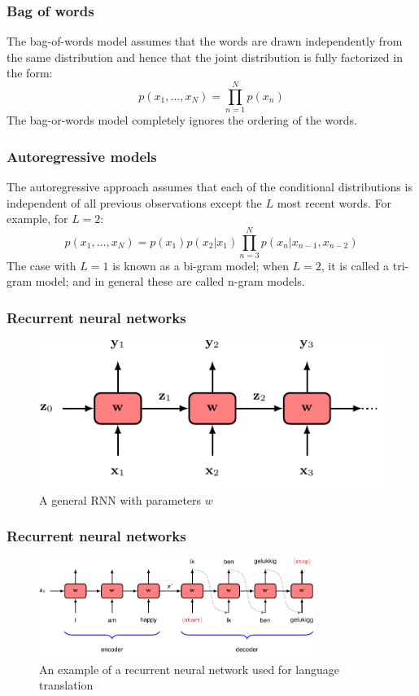 \documentclass{beamer}
\begin{document}
\begin{frame}
    \frametitle{Bag of words}
    The bag-of-words model assumes that the words are drawn independently from the same distribution and hence that the joint distribution is fully factorized in the form:
    \begin{equation*}
        p(x_{1},\hdots,x_{N})=\prod_{n=1}^{N}p(x_{n})
    \end{equation*}
    The bag-or-words model completely ignores the ordering of the words.
\end{frame}

\begin{frame}
    \frametitle{Autoregressive models}
    The autoregressive approach assumes that each of the conditional distributions is independent of all previous observations except the $L$ most recent words. For example, for $L=2$:
    \begin{equation*}
        p(x_{1},\hdots,x_{N})=p(x_{1})p(x_{2}|x_{1})\prod_{n=3}^{N}p(x_{n}|x_{n-1},x_{n-2})
    \end{equation*}
    The case with $L=1$ is known as a bi-gram model; when $L=2$, it is called a tri-gram model; and in general these are called n-gram models.
\end{frame}

\begin{frame}
    \frametitle{Recurrent neural networks}
    \begin{figure}
        \caption{A general RNN with parameters $w$}
        \includegraphics{Figure_13.pdf}
    \end{figure}
\end{frame}

\begin{frame}
    \frametitle{Recurrent neural networks}
    \begin{figure}
        \caption{An example of a recurrent neural network used for language translation}
        \includegraphics[width=0.8\textwidth]{Figure_14.pdf}
    \end{figure}
\end{frame}
\end{document}
